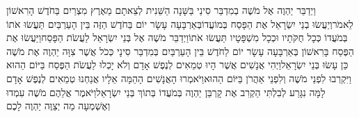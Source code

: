\documentclass[../main/main.tex]{subfiles}
\begin{document}
\begin{multicols*}{\ncols}
וַיְדַבֵּר יַהְוֶה אֶל מֹשֶׁה בְמִדְבַּר סִינַי בַּשָּׁנָה הַשֵּׁנִית לְצֵאתָם מֵאֶרֶץ מִצְרַיִם בַּחֹדֶשׁ הָרִאשׁוֹן לֵאמֹר\PreVerseSpace{}וְיַעֲשׂוּ בְנֵי יִשְׂרָאֵל אֶת הַפָּסַח בְּמוֹעֲדוֹ\PreVerseSpace{}בְּאַרְבָּעָה עָשָׂר יוֹם בַּחֹדֶשׁ הַזֶּה בֵּין הָעַרְבַּיִם תַּעֲשׂוּ אֹתוֹ בְּמֹעֲדוֹ כְּכָל חֻקֹּתָיו וּכְכָל מִשְׁפָּטָיו תַּעֲשׂוּ אֹתוֹ\PreVerseSpace{}וַיְדַבֵּר מֹשֶׁה אֶל בְּנֵי יִשְׂרָאֵל לַעֲשֹׂת הַפָּסַח\PreVerseSpace{}וַיַּעֲשׂוּ אֶת הַפֶּסַח בָּרִאשׁוֹן בְּאַרְבָּעָה עָשָׂר יוֹם לַחֹדֶשׁ בֵּין הָעַרְבַּיִם בְּמִדְבַּר סִינָי כְּכֹל אֲשֶׁר צִוָּה יַהְוֶה אֶת מֹשֶׁה כֵּן עָשׂוּ בְּנֵי יִשְׂרָאֵל\PreVerseSpace{}וַיְהִי אֲנָשִׁים אֲשֶׁר הָיוּ טְמֵאִים לְנֶפֶשׁ אָדָם וְלֹא יָכְלוּ לַעֲשֹׂת הַפֶּסַח בַּיּוֹם הַהוּא וַיִּקְרְבוּ לִפְנֵי מֹשֶׁה וְלִפְנֵי אַהֲרֹן בַּיּוֹם הַהוּא\PreVerseSpace{}וַיֹּאמְרוּ הָאֲנָשִׁים הָהֵמָּה אֵלָיו אֲנַחְנוּ טְמֵאִים לְנֶפֶשׁ אָדָם לָמָּה נִגָּרַע לְבִלְתִּי הַקְרִב אֶת קָרְבַּן יַהְוֶה בְּמֹעֲדוֹ בְּתוֹךְ בְּנֵי יִשְׂרָאֵל\PreVerseSpace{}וַיֹּאמֶר אֲלֵהֶם מֹשֶׁה עִמְדוּ וְאֶשְׁמְעָה מַה יְצַוֶּה יַהְוֶה לָכֶם\OpenSection{}\par

\end{multicols*}
\end{document}
